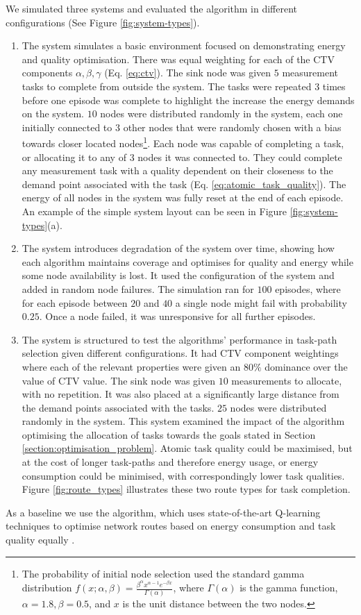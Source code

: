 We simulated three systems and evaluated the algorithm in different configurations (See Figure \ref{fig:system-types}).  
\begin{enumerate}
	\item The \simulationSimple{}{} system simulates a basic environment focused on demonstrating energy and quality optimisation.  There was  equal weighting for each of the CTV components $\alpha, \beta, \gamma$ (Eq. \ref{eq:ctv}). The sink node was given $5$ measurement tasks to complete from outside the system. The tasks were repeated $3$ times before one episode was complete to highlight the increase the energy demands on the system. $10$ nodes were distributed randomly in the system, each one initially connected to $3$ other nodes that were randomly chosen with a bias towards closer located nodes\footnote{
		The probability of initial node selection used the standard gamma distribution $f(x; \alpha, \beta) = \frac{\beta^{\alpha} x^{\alpha-1}e^{- \beta x}}   {\Gamma(\alpha)}$, where $\Gamma(\alpha)$ is the  gamma function, $\alpha=1.8, \beta=0.5$, and $x$ is the unit distance between the two nodes.
	}.  Each node was capable of completing a task, or allocating it to any of $3$ nodes it was connected to. They could complete any measurement task with a quality dependent on their closeness to the demand point associated with the task (Eq. \ref{eq:atomic_task_quality}). The energy of all nodes in the system was fully reset at the end of each episode. An example of the simple system layout can be seen in Figure \ref{fig:system-types}(a). 

	\item The \simulationNodeFailure{}{} system introduces degradation of the system over time, showing how each algorithm maintains coverage and optimises for quality and energy while some node availability is lost. It used the configuration of the \simulationSimple{}{} system and added in random node failures. The simulation ran for $100$ episodes, where for each episode between $20$ and $40$  a single node might fail with probability $0.25$. Once a node failed, it was unresponsive for all further episodes. 
	
	\item The \simulationExtended{}{} system is structured to test the algorithms' performance in task-path selection given different configurations. 
	It had CTV component weightings where each of the relevant properties were given an $80\%$ dominance over the value of CTV value. The sink node was given $10$ measurements to allocate, with no repetition. It was also placed at a significantly large distance from the demand points associated with the tasks. $25$ nodes were distributed randomly in the system. This system examined the impact of the algorithm optimising the allocation of tasks towards the goals stated in Section \ref{section:optimisation_problem}. Atomic task quality could be maximised, but at the cost of longer task-paths and therefore energy usage, or energy consumption could be minimised, with correspondingly lower task qualities. Figure \ref{fig:route_types} illustrates these two route types for task completion.
\end{enumerate}
  As a baseline we use the \acronymQRouting{}{} algorithm, which uses state-of-the-art Q-learning techniques to optimise network routes based on energy consumption and task quality equally \citep{XXX, XXX}.